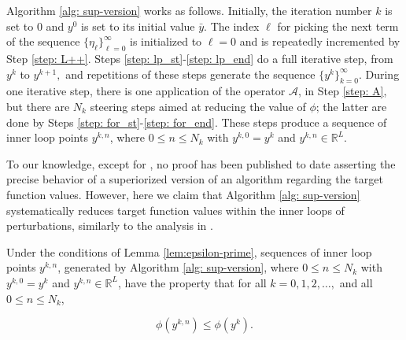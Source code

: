 \documentclass[smallextended]{svjour3}      %
\begin{document}
Algorithm \ref{alg: sup-version} works as follows. Initially, the iteration number $k$ is set to 0 and $y^{0}$ is set to its initial value $\bar{y}$. The index $\ell$ for picking the next term of the sequence $\{\eta_{\ell}\}_{\ell=0}^{\infty}$ is initialized to $\ell=0$ and is repeatedly incremented by Step \ref{step: L++}. Steps \ref{step: lp_st}-\ref{step: lp_end} do a full iterative step, from $y^{k}$ to $y^{k+1},$ and repetitions of these steps generate the sequence $\{y^{k}\}_{k=0}^{\infty}$. During one iterative step, there is one application of the operator $\mathcal{A}$, in Step \ref{step: A}, but there are $N_{k}$ steering steps aimed at reducing the value of $\phi$; the latter are done by Steps \ref{step: for_st}-\ref{step: for_end}. These steps produce a sequence of inner loop points $y^{k,n}$, where $0\leq n\leq N_{k}$ with $y^{k,0}=y^{k}$ and $y^{k,n}\in\mathbb{R}^{L}$.

To our knowledge, except for \cite{strictfejer}, no proof has been published to date asserting the precise behavior of a superiorized version of an algorithm regarding  the target function values. However, here we claim that Algorithm \ref{alg: sup-version} systematically reduces target function values within the inner loops of perturbations, similarly to the analysis in \cite[Subection II.E]{herman2012superiorization}.
\begin{theorem}
	Under the conditions of Lemma \ref{lem:epsilon-prime}, sequences of inner loop points $y^{k,n}$, generated by Algorithm \ref{alg: sup-version}, where $0\leq n\leq N_{k}$ with $y^{k,0}=y^{k}$ and $y^{k,n}\in\mathbb{R}^{L}$, have the property that for all $k=0,1,2,\ldots,$ and all $0\leq n\leq N_{k}$,
\end{theorem}
\begin{equation}
\phi(y^{k,n})\leq\phi(y^{k}).
\end{equation}
\end{document}
